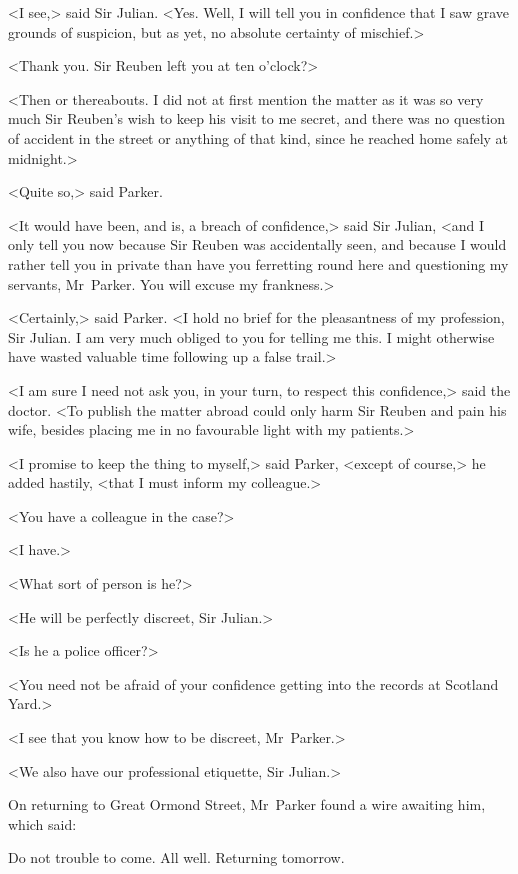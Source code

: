 <I see,> said Sir Julian. <Yes. Well, I will tell you in confidence that I saw grave grounds of suspicion, but as yet, no absolute certainty of mischief.>

<Thank you. Sir Reuben left you at ten o'clock?>

<Then or thereabouts. I did not at first mention the matter as it was so very much Sir Reuben's wish to keep his visit to me secret, and there was no question of accident in the street or anything of that kind, since he reached home safely at midnight.>

<Quite so,> said Parker.

<It would have been, and is, a breach of confidence,> said Sir Julian, <and I only tell you now because Sir Reuben was accidentally seen, and because I would rather tell you in private than have you ferretting round here and questioning my servants, Mr~Parker. You will excuse my frankness.>

<Certainly,> said Parker. <I hold no brief for the pleasantness of my profession, Sir Julian. I am very much obliged to you for telling me this. I might otherwise have wasted valuable time following up a false trail.>

<I am sure I need not ask you, in your turn, to respect this confidence,> said the doctor. <To publish the matter abroad could only harm Sir Reuben and pain his wife, besides placing me in no favourable light with my patients.>

<I promise to keep the thing to myself,> said Parker, <except of course,> he added hastily, <that I must inform my colleague.>

<You have a colleague in the case?>

<I have.>

<What sort of person is he?>

<He will be perfectly discreet, Sir Julian.>

<Is he a police officer?>

<You need not be afraid of your confidence getting into the records at Scotland Yard.>

<I see that you know how to be discreet, Mr~Parker.>

<We also have our professional etiquette, Sir Julian.>

On returning to Great Ormond Street, Mr~Parker found a wire awaiting him, which said: \begin{telegram}[Wimsey]
Do not trouble to come. All well. Returning tomorrow.
\end{telegram}